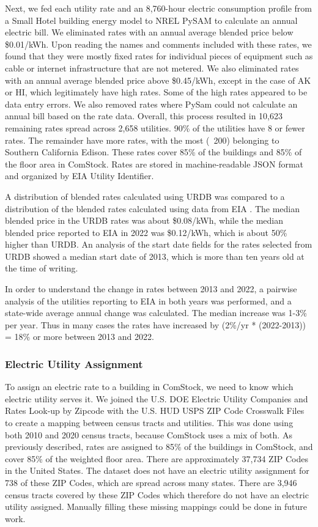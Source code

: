Next, we fed each utility rate and an 8,760-hour electric consumption profile from a Small Hotel building energy model to NREL PySAM \citep{pysam} to calculate an annual electric bill. We eliminated rates with an annual average blended price below \$0.01/kWh. Upon reading the names and comments included with these rates, we found that they were mostly fixed rates for individual pieces of equipment such as cable or internet infrastructure that are not metered. We also eliminated rates with an annual average blended price above \$0.45/kWh, except in the case of AK or HI, which legitimately have high rates. Some of the high rates appeared to be data entry errors. We also removed rates where PySam could not calculate an annual bill based on the rate data. Overall, this process resulted in 10,623 remaining rates spread across 2,658 utilities. 90\% of the utilities have 8 or fewer rates. The remainder have more rates, with the most (~200) belonging to Southern California Edison. These rates cover 85\% of the buildings and 85\% of the floor area in ComStock. Rates are stored in machine-readable JSON format and organized by EIA Utility Identifier.

A distribution of blended rates calculated using URDB was compared to a distribution of the blended rates calculated using data from EIA \citep{eia_electricity}. The median blended price in the URDB rates was about \$0.08/kWh, while the median blended price reported to EIA in 2022 was \$0.12/kWh, which is about 50\% higher than URDB. An analysis of the start date fields for the rates selected from URDB showed a median start date of 2013, which is more than ten years old at the time of writing.

In order to understand the change in rates between 2013 and 2022, a pairwise analysis of the utilities reporting to EIA \citep{eia_electricity} in both years was performed, and a state-wide average annual change was calculated. The median increase was 1-3\% per year. Thus in many cases the rates have increased by (2\%/yr * (2022-2013)) = 18\% or more between 2013 and 2022.

\subsubsection{Electric Utility Assignment}
To assign an electric rate to a building in ComStock, we need to know which electric utility serves it. We joined the U.S. DOE Electric Utility Companies and Rates Look-up by Zipcode \citep{zip_to_util} with the U.S. HUD USPS ZIP Code Crosswalk Files \citep{tract_to_zip} to create a mapping between census tracts and utilities. This was done using both 2010 and 2020 census tracts, because ComStock uses a mix of both.
As previously described, rates are assigned to 85\% of the buildings in ComStock, and cover 85\% of the weighted floor area. There are approximately 37,734 ZIP Codes in the United States. The dataset does not have an electric utility assignment for 738 of these ZIP Codes, which are spread across many states. There are 3,946 census tracts covered by these ZIP Codes which therefore do not have an electric utility assigned. Manually filling these missing mappings could be done in future work.

